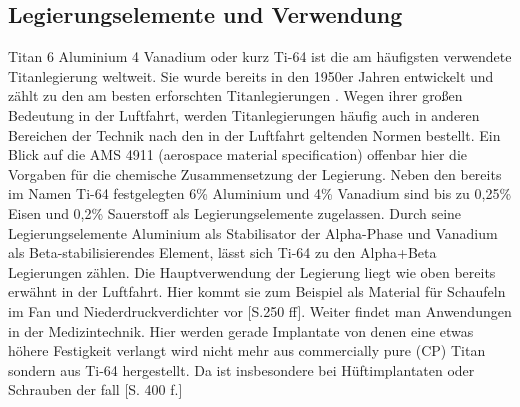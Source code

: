 \documentclass[a4paper, 11pt]{tubsreprt}
\begin{document}
\subsection{Legierungselemente und Verwendung}
Titan 6 Aluminium 4 Vanadium oder kurz Ti-64 ist die am häufigsten verwendete Titanlegierung weltweit. Sie wurde bereits in den 1950er Jahren entwickelt und zählt zu den am besten erforschten Titanlegierungen \cite{Leyens2002}. Wegen ihrer großen Bedeutung in der Luftfahrt, werden Titanlegierungen häufig auch in anderen Bereichen der Technik nach den in der Luftfahrt geltenden Normen bestellt. Ein Blick auf die AMS 4911 (aerospace material specification) offenbar hier die Vorgaben für die chemische Zusammensetzung der Legierung. Neben den bereits im Namen Ti-64 festgelegten 6\% Aluminium und 4\% Vanadium sind bis zu 0,25\% Eisen und 0,2\% Sauerstoff als Legierungselemente zugelassen. Durch seine Legierungselemente Aluminium als Stabilisator der Alpha-Phase und Vanadium als Beta-stabilisierendes Element, lässt sich Ti-64 zu den Alpha+Beta Legierungen zählen.
Die Hauptverwendung der Legierung liegt wie oben bereits erwähnt in der Luftfahrt. Hier kommt sie zum Beispiel als Material für Schaufeln im Fan und Niederdruckverdichter vor \cite{Luetjering2007}[S.250 ff]. Weiter findet man Anwendungen in der Medizintechnik. Hier werden gerade Implantate von denen eine etwas höhere Festigkeit verlangt wird nicht mehr aus commercially pure (CP) Titan sondern aus Ti-64 hergestellt. Da ist insbesondere bei Hüftimplantaten oder Schrauben der fall \cite{Luetjering2007}[S. 400 f.]
\end{document}
